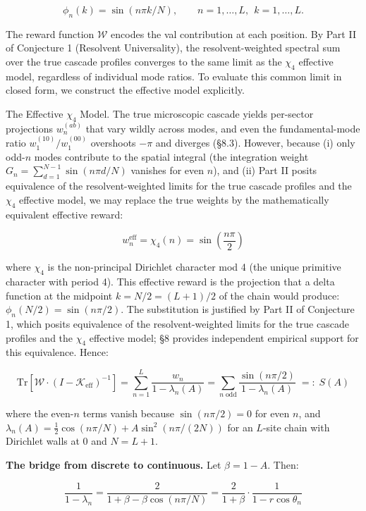 \documentclass[
  11pt,
]{article}
\begin{document}
\[\phi_n(k) = \sin(n\pi k/N), \qquad n = 1, \ldots, L,\ \ k = 1, \ldots, L.\]

The reward function \(\mathcal{W}\) encodes the val contribution at each
position. By Part II of Conjecture 1 (Resolvent Universality), the
resolvent-weighted spectral sum over the true cascade profiles converges to the
same limit as the \(\chi_4\) effective model, regardless of individual mode
ratios. To evaluate this common limit in closed form, we construct the effective
model explicitly.

The Effective \(\chi_4\) Model. The true microscopic cascade yields per-sector
projections \(w_n^{(ab)}\) that vary wildly across modes, and even the
fundamental-mode ratio \(w_1^{(10)}/w_1^{(00)}\) overshoots \(-\pi\) and
diverges (§8.3). However, because (i) only odd-\(n\) modes contribute to the
spatial integral (the integration weight
\(G_n = \sum_{d=1}^{N-1} \sin(n\pi d/N)\) vanishes for even \(n\)), and (ii)
Part II posits equivalence of the resolvent-weighted limits for the true cascade
profiles and the \(\chi_4\) effective model, we may replace the true weights by
the mathematically equivalent effective reward:

\[w_n^{\mathrm{eff}} = \chi_4(n) = \sin\!\left(\frac{n\pi}{2}\right)\]

where \(\chi_4\) is the non-principal Dirichlet character mod 4 (the unique
primitive character with period 4). This effective reward is the projection that
a delta function at the midpoint \(k = N/2 = (L+1)/2\) of the chain would
produce: \(\phi_n(N/2) = \sin(n\pi/2)\). The substitution is justified by Part
II of Conjecture 1, which posits equivalence of the resolvent-weighted limits
for the true cascade profiles and the \(\chi_4\) effective model; §8 provides
independent empirical support for this equivalence. Hence:

\[\mathrm{Tr}[\mathcal{W} \cdot (I - \mathcal{K}_{\mathrm{eff}})^{-1}] = \sum_{n=1}^{L} \frac{w_n}{1 - \lambda_n(A)} = \sum_{n\;\mathrm{odd}} \frac{\sin(n\pi/2)}{1 - \lambda_n(A)} \;=:\; S(A)\]

where the even-\(n\) terms vanish because \(\sin(n\pi/2) = 0\) for even \(n\),
and \(\lambda_n(A) = \tfrac{1}{2}\cos(n\pi/N) + A\sin^2(n\pi/(2N))\) for an
\(L\)-site chain with Dirichlet walls at \(0\) and \(N = L+1\).

\textbf{The bridge from discrete to continuous.} Let \(\beta = 1 - A\). Then:

\[\frac{1}{1 - \lambda_n} = \frac{2}{1 + \beta - \beta\cos(n\pi/N)} = \frac{2}{1+\beta} \cdot \frac{1}{1 - r\cos\theta_n}\]
\end{document}
